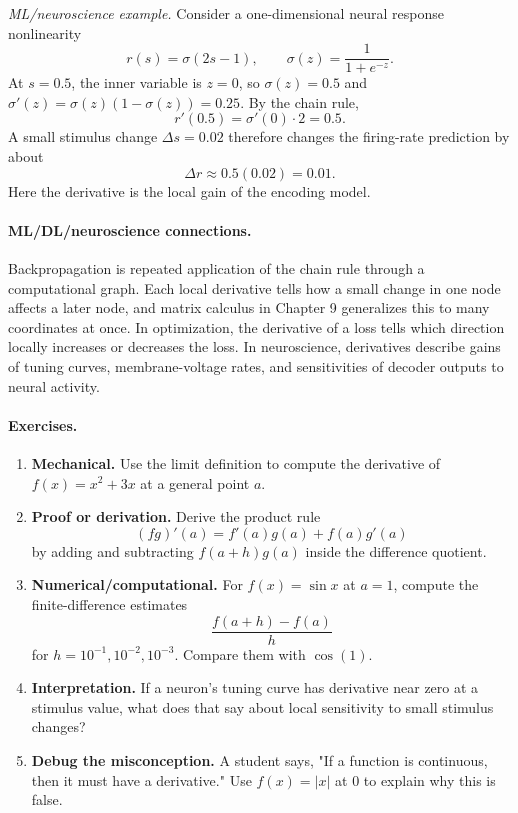 \emph{ML/neuroscience example.} Consider a one-dimensional neural response nonlinearity
\[
r(s)=\sigma(2s-1),
\qquad
\sigma(z)=\frac{1}{1+e^{-z}}.
\]
At \(s=0.5\), the inner variable is \(z=0\), so \(\sigma(z)=0.5\) and \(\sigma'(z)=\sigma(z)(1-\sigma(z))=0.25\). By the chain rule,
\[
r'(0.5)=\sigma'(0)\cdot 2=0.5.
\]
A small stimulus change \(\Delta s=0.02\) therefore changes the firing-rate prediction by about
\[
\Delta r\approx 0.5(0.02)=0.01.
\]
Here the derivative is the local gain of the encoding model.

\paragraph{ML/DL/neuroscience connections.}
Backpropagation is repeated application of the chain rule through a computational graph. Each local derivative tells how a small change in one node affects a later node, and matrix calculus in Chapter 9 generalizes this to many coordinates at once. In optimization, the derivative of a loss tells which direction locally increases or decreases the loss. In neuroscience, derivatives describe gains of tuning curves, membrane-voltage rates, and sensitivities of decoder outputs to neural activity.

\paragraph{Exercises.}
\begin{enumerate}[label=\textbf{8.2.\arabic*.}, leftmargin=*]
\item \textbf{Mechanical.} Use the limit definition to compute the derivative of \(f(x)=x^2+3x\) at a general point \(a\).
\item \textbf{Proof or derivation.} Derive the product rule
\[
(fg)'(a)=f'(a)g(a)+f(a)g'(a)
\]
by adding and subtracting \(f(a+h)g(a)\) inside the difference quotient.
\item \textbf{Numerical/computational.} For \(f(x)=\sin x\) at \(a=1\), compute the finite-difference estimates
\[
\frac{f(a+h)-f(a)}{h}
\]
for \(h=10^{-1},10^{-2},10^{-3}\). Compare them with \(\cos(1)\).
\item \textbf{Interpretation.} If a neuron's tuning curve has derivative near zero at a stimulus value, what does that say about local sensitivity to small stimulus changes?
\item \textbf{Debug the misconception.} A student says, "If a function is continuous, then it must have a derivative." Use \(f(x)=|x|\) at \(0\) to explain why this is false.
\end{enumerate}

